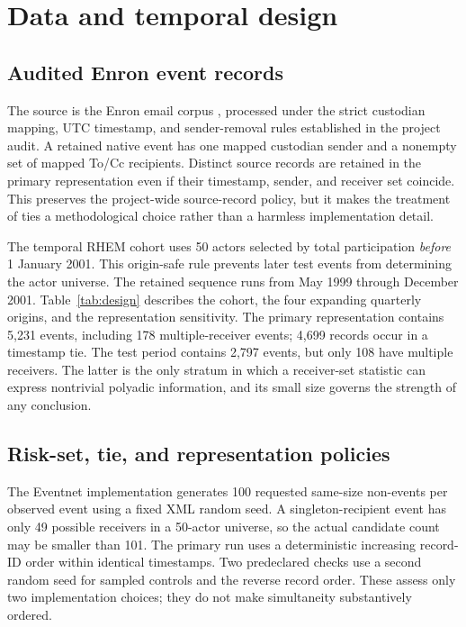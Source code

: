 \documentclass[11pt]{article}
\begin{document}
\section{Data and temporal design}\label{sec:data}

\subsection{Audited Enron event records}

The source is the Enron email corpus \citep{klimtYang2004}, processed under the strict custodian mapping, UTC timestamp, and sender-removal rules established in the project audit. A retained native event has one mapped custodian sender and a nonempty set of mapped To/Cc recipients. Distinct source records are retained in the primary representation even if their timestamp, sender, and receiver set coincide. This preserves the project-wide source-record policy, but it makes the treatment of ties a methodological choice rather than a harmless implementation detail.

The temporal RHEM cohort uses 50 actors selected by total participation \emph{before} 1 January 2001. This origin-safe rule prevents later test events from determining the actor universe. The retained sequence runs from May 1999 through December 2001. Table~\ref{tab:design} describes the cohort, the four expanding quarterly origins, and the representation sensitivity. The primary representation contains 5,231 events, including 178 multiple-receiver events; 4,699 records occur in a timestamp tie. The test period contains 2,797 events, but only 108 have multiple receivers. The latter is the only stratum in which a receiver-set statistic can express nontrivial polyadic information, and its small size governs the strength of any conclusion.



\subsection{Risk-set, tie, and representation policies}

The Eventnet implementation \citep{eventnet2026} generates 100 requested same-size non-events per observed event using a fixed XML random seed. A singleton-recipient event has only 49 possible receivers in a 50-actor universe, so the actual candidate count may be smaller than 101. The primary run uses a deterministic increasing record-ID order within identical timestamps. Two predeclared checks use a second random seed for sampled controls and the reverse record order. These assess only two implementation choices; they do not make simultaneity substantively ordered.
\end{document}
